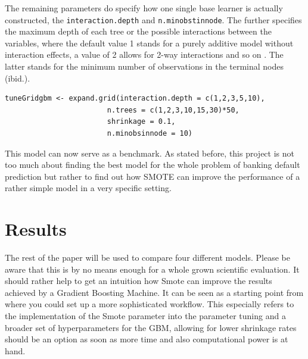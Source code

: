 \documentclass[12pt,a4paper]{article}
\begin{document}
The remaining parameters do specify how one single base learner is actually constructed, the \verb+interaction.depth+ and \verb+n.minobstinnode+. The further specifies the maximum depth of each tree or the possible interactions between the variables, where the default value 1 stands for a purely additive model without interaction effects, a value of 2 allows for 2-way interactions and so on \cite{Torgo2010}. The latter stands for the minimum number of observations in the terminal nodes (ibid.).  
\begin{verbatim}
tuneGridgbm <- expand.grid(interaction.depth = c(1,2,3,5,10), 
                        n.trees = c(1,2,3,10,15,30)*50,
                        shrinkage = 0.1,
                        n.minobsinnode = 10)
\end{verbatim}
This model can now serve as a benchmark. As stated before, this project is not too much about finding the best model for the whole problem of banking default prediction but rather to find out how SMOTE can improve the performance of a rather simple model in a very specific setting.
\section{Results}
The rest of the paper will be used to compare four different models. Please be aware that this is by no means enough for a whole grown scientific evaluation. It should rather help to get an intuition how Smote can improve the results achieved by a Gradient Boosting Machine. It can be seen as a starting point from where you could set up a more sophisticated workflow. This especially refers to the implementation of the Smote parameter into the parameter tuning and a broader set of hyperparameters for the GBM, allowing for lower shrinkage rates should be an option as soon as more time and also computational power is at hand.
\end{document}
